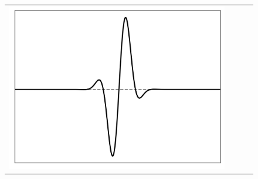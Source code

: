 \documentclass[10pt,final,xcolor=dvipsnames]{beamer}
\begin{document}
\begin{frame}
\begin{figure}
{\begin{tabular}{cccc}
	    \includegraphics[scale=0.2]{localpsf_revised_figures/frog_1d_a=27.0.png} & 

\end{tabular}}
\end{figure}
\end{frame}
\end{document}
